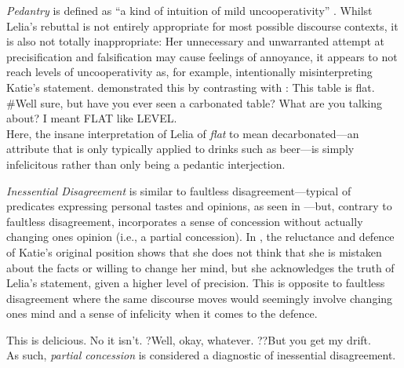 \textit{Pedantry} is defined as \enquote{a kind of intuition of mild uncooperativity} \parencite[p. 114]{Klecha2014}. Whilst Lelia's rebuttal is not entirely appropriate for most possible discourse contexts, it is also not totally inappropriate: Her unnecessary and unwarranted attempt at precisification and falsification may cause feelings of annoyance, it appears to not reach levels of uncooperativity as, for example, intentionally misinterpreting Katie's statement. \textcite{Klecha2014} demonstrated this by contrasting  with :
\pex{}%
\a{}This table is flat.
\a{}\#Well sure, but have you ever seen a carbonated table?
\a{}What are you talking about? I meant \MakeUppercase{flat} like \MakeUppercase{level}.\\\emptyfill\parencite[p. 114]{Klecha2014}
\xe
Here, the insane interpretation of Lelia of \textit{flat} to mean decarbonated---an attribute that is only typically applied to drinks such as beer---is simply infelicitous rather than only being a pedantic interjection.

\textit{Inessential Disagreement} is similar to faultless disagreement---typical of predicates expressing personal tastes and opinions, as seen in ---but, contrary to faultless disagreement, incorporates a sense of concession without actually changing ones opinion (i.e., a partial concession). In , the reluctance and defence of Katie's original position shows that she does not think that she is mistaken about the facts or willing to change her mind, but she acknowledges the truth of Lelia's statement, given a higher level of precision. This is opposite to faultless disagreement where the same discourse moves would seemingly involve changing ones mind and a sense of infelicity when it comes to the defence.\enlargethispage*{2\baselineskip}

\pex{}%
\a{}This is delicious.
\a{}No it isn’t.
\a{}?Well, okay, whatever. ??But you get my drift.\\\emptyfill\parencite[adapted from][p. 114]{Klecha2014}
\xe
As such, \textit{partial concession} is considered a diagnostic of inessential disagreement.

